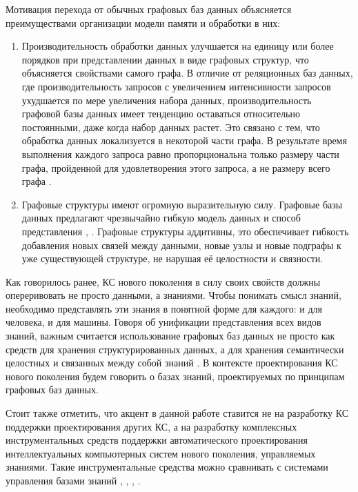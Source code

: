 Мотивация перехода от обычных графовых баз данных объясняется преимуществами организации модели памяти и обработки в них:
\begin{enumerate}
    \item Производительность обработки данных улучшается на единицу или более порядков при представлении данных в виде графовых структур, что объясняется свойствами самого графа. В отличие от реляционных баз данных, где производительность запросов с увеличением интенсивности запросов ухудшается по мере увеличения набора данных, производительность графовой базы данных имеет тенденцию оставаться относительно постоянными, даже когда набор данных растет. Это связано с тем, что обработка данных локализуется в некоторой части графа. В результате время выполнения каждого запроса равно пропорциональна только размеру части графа, пройденной для удовлетворения этого запроса, а не размеру всего графа \cite{Khasahmadi2020Memory-Based}.
    \item Графовые структуры имеют огромную выразительную силу. Графовые базы данных предлагают чрезвычайно гибкую модель данных и способ представления \cite{Diskrete_Math}, \cite{Reinhard}. Графовые структуры аддитивны, это обеспечивает гибкость добавления новых связей между данными, новые узлы и новые подграфы к уже существующей структуре, не нарушая её целостности и связности.
\end{enumerate}

Как говорилось ранее, КС нового поколения в силу своих свойств должны опереривовать не просто данными, а знаниями. Чтобы понимать смысл знаний, необходимо представлять эти знания в понятной форме для каждого: и для человека, и для машины. Говоря об унификации представления всех видов знаний, важным считается использование графовых баз данных не просто как средств для хранения структурированных данных, а для хранения семантически целостных и связанных между собой знаний \cite{SenKB2017}. В контексте проектирования КС нового поколения будем говорить о базах знаний, проектируемых по принципам графовых баз данных.

Стоит также отметить, что акцент в данной работе ставится не на разработку КС поддержки проектирования других КС, а на разработку комплексных инструментальных средств поддержки автоматического проектирования интеллектуальных компьютерных систем нового поколения, управляемых знаниями. Такие инструментальные средства можно сравнивать с системами управления базами знаний \cite{Naumova1991}, \cite{Gavrilova2000}, \cite{BashlyakovKB2010}, \cite{BashlyakovKB2013}.

